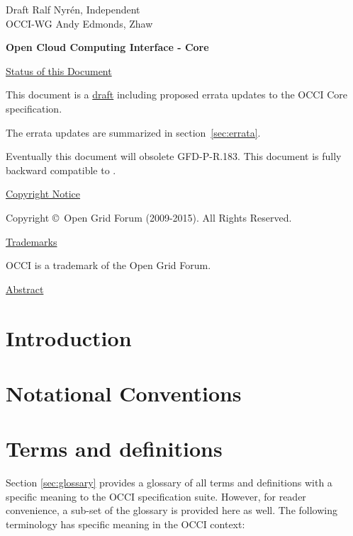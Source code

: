 \documentclass[10pt,a4paper]{article}
\begin{document}
\thispagestyle{empty}

Draft \hfill  {Ralf Nyrén, Independent}\\
OCCI-WG \hfill  Andy Edmonds, Zhaw
\\

\vspace*{0.5in}

\begin{Large}
\textbf{Open Cloud Computing Interface - Core}
\end{Large}

\vspace*{0.5in}

\underline{Status of this Document}

% 

This document is a \underline{draft} including proposed errata updates to the
OCCI Core \cite{occi:core} specification.

The errata updates are summarized in section~\ref{sec:errata}.

Eventually this document will obsolete GFD-P-R.183. This document is fully backward compatible to \cite{occi:core}.

\underline{Copyright Notice}

Copyright \copyright ~Open Grid Forum (2009-2015). All Rights Reserved.

\underline{Trademarks}

OCCI is a trademark of the Open Grid Forum.

\underline{Abstract}



\newpage
\tableofcontents
\newpage

\section{Introduction}


\section{Notational Conventions}


\section{Terms and definitions}
Section \ref{sec:glossary} provides a glossary of all terms and
definitions with a specific meaning to the OCCI specification
suite. However, for reader convenience, a sub-set of the glossary is
provided here as well. The following terminology has specific meaning
in the OCCI context:
\end{document}

